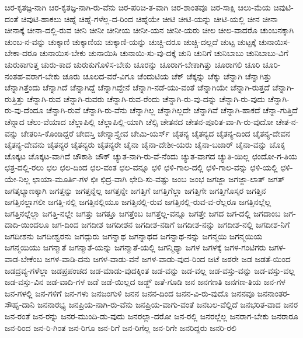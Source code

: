 {ಚಿರ-ಕೃತಜ್ಞ-ನಾಗಿ
ಚಿರ-ಕೃತಜ್ಞ-ನಾಗಿ-ರು-ವೆನು
ಚಿರ-ಪರಿಚಿ-ತ-ವಾಗಿ
ಚಿರ-ಶಾಂತವೂ
ಚಿರ-ಸಾಕ್ಷಿ
ಚಿಲು-ಮೆಯ
ಚಿವುಟಿ-ದಂತೆ
ಚಿವುಟಿ-ಹಾಕಲು
ಚಿಹ್ನೆ
ಚಿಹ್ನೆ-ಗಳೆಲ್ಲ-ದ-ರಿಂದ
ಚಿಹ್ನೆಯೇ
ಚೀಟಿ
ಚೀಟಿ-ಯನ್ನು
ಚೀಟಿ-ಯಲ್ಲಿ
ಚೀನ
ಚೀನಾ
ಚೀನಾಕ್ಕೆ
ಚೀನಾ-ದಲ್ಲಿ-ರುವ
ಚೀನಿ
ಚೀನೀ
ಚೀನೀಯ
ಚೀನೀ-ಯನ
ಚೀನೀ-ಯರು
ಚೀಲ
ಚೀಲ-ವಾದರೊ
ಚುಂಬನಕ್ಕಾಗಿ
ಚುಂಬ-ನ-ವನ್ನು
ಚುಕ್ಕಾಣಿ
ಚುಕ್ಕಾಣಿಯ
ಚುಕ್ಕಾಣಿ-ಯನ್ನು
ಚುಚ್ಚಿ-ದರೂ
ಚುಚ್ಚಿ-ದಲ್ಲದೆ
ಚುಟ್ಟ
ಚುಟ್ಟಕ್ಕೆ
ಚುನಾಯಿಸ-ಬೇಕಾ-ದರೂ
ಚುನಾಯಿಸ-ಬೇಕು
ಚುನಾಯಿಸಿ
ಚುನಾಯಿ-ಸು-ವು-ದಕ್ಕೆ
ಚುನಿ
ಚುನಿಗೆ
ಚುನಿಬಾಬು
ಚುನಿಬಾಬು-ವಿಗೆ
ಚುರುಕಾಗುತ್ತ
ಚುರು-ಕಾದ
ಚುರುಕುಗೊಳಿಸ-ಬೇಕು
ಚೂರನ್ನು
ಚೂರಾಗ-ಬೇಕಾಗಿತ್ತು
ಚೂರಾಗಲಿ
ಚೂರಿ
ಚೂರಿ-ನಂತಹ-ವರಾಗ-ಬೇಕು
ಚೂರು
ಚೂಲದ-ವರೆ-ವಿಗೂ
ಚೆಂದುಟಿಯ
ಚೆಕ್
ಚೆಕ್ಕನ್ನು
ಚೆಕ್ಕು
ಚೆನ್ನಾಗಿ
ಚೆನ್ನಾಗಿತ್ತು
ಚೆನ್ನಾಗಿತ್ತೆಂದು
ಚೆನ್ನಾಗಿದೆ
ಚೆನ್ನಾಗಿದ್ದೆ
ಚೆನ್ನಾಗಿದ್ದೇನೆ
ಚೆನ್ನಾಗಿ-ನಡೆ-ಯು-ವಂತೆ
ಚೆನ್ನಾಗಿಯೇ
ಚೆನ್ನಾಗಿ-ರುತ್ತದೆ
ಚೆನ್ನಾಗಿ-ರುತ್ತಿತ್ತು
ಚೆನ್ನಾಗಿ-ರುವ
ಚೆನ್ನಾಗಿ-ರುವರು
ಚೆನ್ನಾಗಿ-ರುವ-ರೆಂದು
ಚೆನ್ನಾಗಿ-ರು-ವು-ದನ್ನು
ಚೆನ್ನಾಗಿ-ರು-ವುದು
ಚೆನ್ನಾಗಿ-ರು-ವು-ದೆಂದೂ
ಚೆನ್ನಾಗಿ-ರುವೆ
ಚೆನ್ನಾಗಿ-ರು-ವೆನು
ಚೆನ್ನಾಗಿಲ್ಲ
ಚೆನ್ನಾಗಿಲ್ಲದೇ
ಚೆನ್ನಾಗಿವೆ
ಚೆನ್ನಾಗಿ-ಹಾಕದೆ
ಚೆನ್ನಾ-ಗುತ್ತಿದೆ
ಚೆನ್ನಾದ
ಚೆಲು-ವೆಯಾದ
ಚೆಲ್ಲಾಪಿಲ್ಲಿ
ಚೆಲ್ಲಾಪಿಲ್ಲಿ-ಯಾಗಿ
ಚೆಲ್ಸಿ
ಚೇತನದ
ಚೇತನ-ಪೂರಿತ-ವಾ-ಗಿ-ರು-ವುದೋ
ಚೇತ-ನ-ವನ್ನು
ಚೇತರಿಸಿ-ಕೊಂಡಿದ್ದರೆ
ಚೇದಸ್ತಿ
ಚೇನ್ನಾಸ್ತ್ಯೇವ
ಚೇಮಿ-ಯರ್ಸ್
ಚೈತನ್ಯ
ಚೈತನ್ಯದ
ಚೈತನ್ಯ-ದಿಂದ
ಚೈತನ್ಯ-ದೇವನ
ಚೈತನ್ಯ-ದೇವನು
ಚೈತನ್ಯರ
ಚೈತನ್ಯರು
ಚೈತನ್ಯರೇ
ಚೈನಾ
ಚೈನಾ-ದೇಶೀ-ಯರು
ಚೈನಾ-ಬಜಾರ್
ಚೈನಾ-ವನ್ನು
ಚೊಕ್ಕ
ಚೊಕ್ಕಟ
ಚೊಕ್ಕಟ-ವಾಗಿದೆ
ಚೌಕಾಶಿ
ಚೌಕ್
ಚ್ಯುತ-ನಾಗಿ-ರು-ವೆ-ನೆಂದು
ಚ್ಯುತ-ವಾಗದ
ಚ್ಯುತಿ-ಯಿಲ್ಲ
ಛಂದೋ-ಗ-ತಿಯ
ಛತ್ರ-ದಲ್ಲಿ-ರಲು
ಛಲ
ಛಲ-ದಿಂದ
ಛಲ-ವಂತ
ಛಲ-ವನ್ನೂ
ಛಳಿ
ಛಳಿ-ಗಾಲ-ದಲ್ಲಿ
ಛಳಿ-ಗಾಲ-ವನ್ನು
ಛಳಿ-ಯಲ್ಲಿ
ಛಳಿ-ಯೇ-ನಿಲ್ಲ
ಛಾಯಾ-ಮೂರ್ತಿ-ಗಳ
ಛಿಃ
ಛಿದ್ರ-ವಾಗಿ
ಛೇದಿ-ಸು-ವಷ್ಟು
ಜಂಬ
ಜಂಭ
ಜಗಜ್ಜಾ
ಜಗಜ್ಜಾ-ಲಾತ್
ಜಗತ್
ಜಗತ್ಕಲ್ಯಾಣಕ್ಕಾಗಿ
ಜಗತ್ತನ್ನು
ಜಗತ್ತನ್ನೆಲ್ಲ
ಜಗತ್ತನ್ನೇ
ಜಗತ್ತಿಗೆ
ಜಗತ್ತಿಗೆಲ್ಲಾ
ಜಗತ್ತಿಗೇ
ಜಗತ್ತಿಗೊಸ್ಕರ
ಜಗತ್ತಿನ
ಜಗತ್ತಿನಲ್ಲಾಗಲೀ
ಜಗತ್ತಿ-ನಲ್ಲಿ
ಜಗತ್ತಿನಲ್ಲಿಯೂ
ಜಗತ್ತಿನಲ್ಲಿ-ರುವ
ಜಗತ್ತಿನಲ್ಲಿ-ರುವ-ವ-ರೆಲ್ಲರೂ
ಜಗತ್ತಿನಲ್ಲೆಲ್ಲ
ಜಗತ್ತಿನಲ್ಲೆಲ್ಲಾ
ಜಗತ್ತಿ-ನಲ್ಲೇ
ಜಗತ್ತು
ಜಗತ್ತೂ
ಜಗತ್ತೆಂಬ
ಜಗತ್ತೆಲ್ಲ-ವನ್ನೂ
ಜಗತ್ತೇ
ಜಗದ
ಜಗ-ದಲ್ಲಿ
ಜಗದಾಂಬ
ಜಗ-ದಾದಿ-ಯಿಂದಲೂ
ಜಗ-ದಿಂದ
ಜಗದೀಶ
ಜಗದೀಶನ
ಜಗದೀಶ-ನಡಿಗೆ
ಜಗದೀಶ-ನನ್ನು
ಜಗದೀಶ-ನಲ್ಲಿ
ಜಗದೀಶ-ನಿಗೆ
ಜಗದೀಶನು
ಜಗದೀಶ್ವರನು
ಜಗದ್ಗುರು
ಜಗನ್ನಾಥ
ಜಗನ್ನಾಥದ
ಜಗನ್ನಾಥ-ನನ್ನು
ಜಗನ್ಮಯಿ
ಜಗನ್ಮಯಿಯ
ಜಗನ್ಮಯಿಯು
ಜಗನ್ಮಾತೆ
ಜಗನ್ಮಾತೆ-ಯನ್ನು
ಜಗನ್ಮಾತೆ-ಯಲ್ಲಿ
ಜಗನ್ಮಿಥ್ಯಾ
ಜಗಳ
ಜಗಳಕ್ಕೆ
ಜಗಳ-ಗಂಟಿಗರು
ಜಗಳ-ವಾಡ-ಬೇಕೆಂಬ
ಜಗಳ-ವಾಡಿ-ದನು
ಜಗಳ-ವಾಡು-ವನೆ
ಜಗಳ-ವಾಡು-ವುದ-ರಿಂದ
ಜಟೆ
ಜಠರೇ
ಜಡ
ಜಡತೆ-ಯಿಂದ
ಜಡದ್ರವ್ಯ-ಗಳೆಲ್ಲಾ
ಜಡಪ್ರಪಂಚದ
ಜಡ-ಮಾಡು-ವುದಕ್ಕಿಂತ
ಜಡ-ವನ್ನು
ಜಡ-ವಲ್ಲ
ಜಡ-ವಸ್ತು-ವನ್ನು
ಜಡ-ವಸ್ತು-ವಲ್ಲ
ಜಡ-ವಸ್ತು-ವಿನ
ಜಡ-ವಾದಿ-ಗಳ
ಜಡೆ
ಜಡೆ-ಯಿಲ್ಲದ
ಜಡ್ಜ್
ಜತೆ-ಗೂಡಿ
ಜನ
ಜನಗಣತಿ
ಜನಗಣ-ತಿಯ
ಜನ-ಗಳ
ಜನ-ಗಳಲ್ಲಿ
ಜನ-ಗಳಿಗೆ
ಜನ-ಗಳು
ಜನಜಂಗುಳಿ
ಜನನ
ಜನನ-ದಿಂದ
ಜನನ-ವಿ-ರು-ವುದೊ
ಜನನವೂ
ಜನನಾಂತರ-ಸೌಹೃ-ದಾನಿ
ಜನನಾರಭ್ಯ
ಜನಪ್ರಿಯ-ನಾಗಿ-ರು-ವೆನು
ಜನಪ್ರಿಯ-ವಾಗು-ವಂತೆ
ಜನಬಲ-ವೆಲ್ಲಿದೆ
ಜನಭರಿತ-ವಾದ
ಜನರ
ಜನ-ರಂತೆ
ಜನ-ರನ್ನು
ಜನರ-ಮುಂದಿ-ಡು-ವುದು
ಜನರಲ್ಲಾ-ದರೋ
ಜನ-ರಲ್ಲಿ
ಜನರಲ್ಲೆಲ್ಲ
ಜನರಾಗ-ಬೇಕು
ಜನರಾರೂ
ಜನ-ರಿಂದ
ಜನ-ರಿ-ಗಿಂತ
ಜನ-ರಿಗೂ
ಜನ-ರಿಗೆ
ಜನ-ರಿಗೆಲ್ಲ
ಜನ-ರಿಗೇ
ಜನರಿದ್ದರು
ಜನರಿ-ರಲಿ
}

